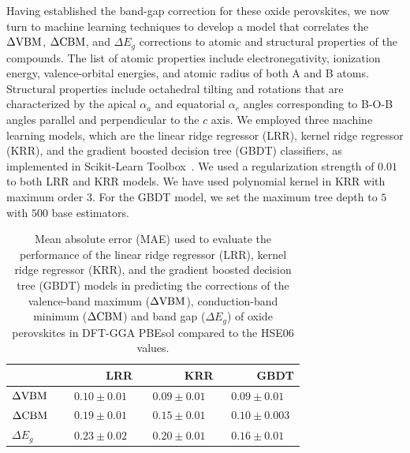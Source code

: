 \documentclass[%
reprint,
superscriptaddress,
citeautoscript,
 amsmath,amssymb,
 aps,
 prl,
floatfix,
]{revtex4-1}
\begin{document}
Having established the band-gap correction for these oxide perovskites, we now turn to machine learning techniques to develop a model that correlates the $\Delta {\rm VBM}$, $\Delta {\rm CBM}$, and $\Delta E_{g}$ corrections to atomic and structural properties of the compounds. The list of atomic properties include electronegativity, ionization energy, valence-orbital energies, and atomic radius of both A and B atoms. Structural properties include octahedral tilting and rotations that are characterized by the apical $\alpha_{a}$ and equatorial $\alpha_{e}$ angles corresponding to B-O-B angles parallel and perpendicular to the $c$ axis. We employed three machine learning models, which are the linear ridge regressor (LRR), kernel ridge regressor (KRR), and the gradient boosted decision tree (GBDT) classifiers,
as implemented in Scikit-Learn Toolbox~\cite{scikit-learn}. We used a regularization strength of $0.01$ to both LRR and KRR models. We have used polynomial kernel in KRR with maximum order $3$. For the GBDT model, we set the maximum tree depth to $5$ with $500$ base estimators.

\begin{table}[htbp]
  \centering
  \caption{Mean absolute error (MAE) used to evaluate the performance of the linear ridge regressor (LRR), kernel ridge regressor (KRR), and the gradient boosted decision tree (GBDT) models in predicting the corrections of the valence-band maximum ($\Delta {\rm VBM}$), conduction-band minimum ($\Delta {\rm CBM}$) and band gap ($\Delta E_{g}$) of oxide perovskites in DFT-GGA PBEsol compared to the HSE06 values. }
    \begin{tabular}{llll}
    \hline\hline
          & \ \ \ \ \ LRR   & \ \ \ \ \ KRR   & \ \ \ \ GBDT \\
    \hline
    $\Delta {\rm VBM}$ \  \ & $0.10 \pm 0.01$ \ \ & $0.09 \pm 0.01$ \ \ & $0.09 \pm 0.01$ \\
    $\Delta {\rm CBM}$ \ \ & $0.19 \pm 0.01$ \  \ & $0.15 \pm 0.01$ \ \ & $0.10 \pm 0.003$ \\
    $\Delta E_{g}$ \ \ & $0.23 \pm 0.02$ \ \ & $0.20 \pm 0.01$ \ \ & $0.16 \pm 0.01$ \\
    \hline
    \end{tabular}%
  \label{tab:comp}%
\end{table}%
\end{document}
